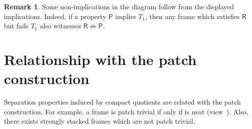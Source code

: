 \documentclass[11pt]{amsart}
\theoremstyle{plain}
\theoremstyle{definition}
\newtheorem{obs}[thm]{Remark}
\begin{document}
\begin{obs}
Some non-implications in the diagram follow from the
displayed implications. Indeed, if a property $\mathsf P$
implies $T_1$, then any frame which satisfies $\mathsf R$
but fails $T_1$ also witnesses
$\mathsf R\not\Rightarrow\mathsf P$.

\end{obs}

\section{Relationship with the patch construction}
Separation properties induced by compact quotients are related with the patch 
construction. For example, a frame is patch trivial if only if is neat
(view~\cite[Lemma 8.2.2]{sexton2003}). Also, there exists strongly stacked frames 
which are not patch trivial.
\end{document}
